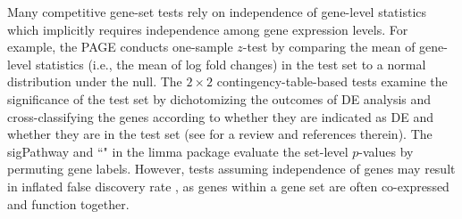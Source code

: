 	
	Many competitive gene-set tests rely on independence of gene-level statistics which implicitly 
	requires independence among gene expression levels.
	For example, the PAGE \citep{kim2005page} conducts one-sample $z$-test by comparing the mean of 
	gene-level statistics (i.e., the mean of log fold changes) in the test set to a normal 
	distribution under the null. The $2\times 2$ contingency-table-based tests examine the 
	significance of the test set by dichotomizing the outcomes of DE analysis and cross-classifying 
	the genes according to whether they are indicated as DE and whether they are in the test set 
	(see \cite{huang2009bioinformatics} for a review and references therein). The sigPathway 
	\citep{tian2005discovering} and ``\gen" in the limma package \citep{Smyth2004moderated} 
	evaluate the set-level $p$-values by permuting gene labels. However, tests assuming 
	independence of genes may result in inflated false discovery rate 
	\citep{efron2007testing,gatti2010heading,goeman2007analyzing, 
	wu2012camera,yaari2013quantitative},
	as genes within a gene set are often co-expressed and function together.
	
